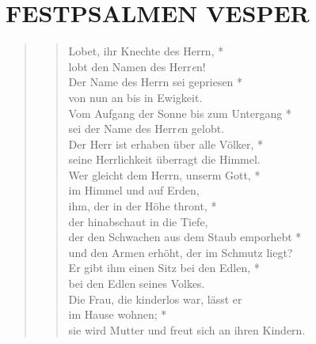 

\section[]{FESTPSALMEN VESPER}



\begin{quote}

\begin{verse}
Lobet, ihr Knechte des Herrn, *\\
lobt den Namen des Herr\textit{e}n!\\ 
\vin Der Name des Herrn sei gepriesen *\\ 
\vin von nun an bis in Ewigkeit.\\
Vom Aufgang der Sonne bis zum Untergang *\\
sei der Name des Herr{\textit{e}}n gelobt.\\ 
\vin Der Herr ist erhaben über alle Völker, *\\ 
\vin seine Herrlichkeit überragt die Himmel.\\ 
Wer gleicht dem Herrn, unserm Gott, *\\
im Himmel und auf Erden,\\ 
\vin ihm, der in der Höhe thront, *\\ 
\vin der hinabschaut in die Tiefe, \\
der den Schwachen aus dem Staub emporhebt *\\
und den Armen erhöht, der im Schmutz liegt?\\ 
\vin Er gibt ihm einen Sitz bei den Edlen, *\\ 
\vin bei den Edlen seines Volkes.\\ 
Die Frau, die kinderlos war, lässt er\\
im Hause wohnen; *\\
sie wird Mutter und freut sich an ihren Kindern.\\ 

\end{verse}
\end{quote}

\vspace{0.3cm}




